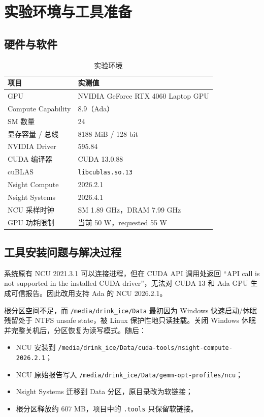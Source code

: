 \documentclass[UTF8,11pt,a4paper,fontset=fandol]{ctexart}
\newcommand{\code}[1]{\nolinkurl{#1}}
\begin{document}
\section{实验环境与工具准备}

\subsection{硬件与软件}

\begin{table}[H]
\centering
\caption{实验环境}
\begin{tabular}{ll}
\toprule
项目 & 实测值 \\
\midrule
GPU & NVIDIA GeForce RTX 4060 Laptop GPU \\
Compute Capability & 8.9（Ada） \\
SM 数量 & 24 \\
显存容量 / 总线 & 8188 MiB / 128 bit \\
NVIDIA Driver & 595.84 \\
CUDA 编译器 & CUDA 13.0.88 \\
cuBLAS & \code{libcublas.so.13} \\
Nsight Compute & 2026.2.1 \\
Nsight Systems & 2026.4.1 \\
NCU 采样时钟 & SM 1.89 GHz，DRAM 7.99 GHz \\
GPU 功耗限制 & 当前 50 W，requested 55 W \\
\bottomrule
\end{tabular}
\end{table}

\subsection{工具安装问题与解决过程}

系统原有 NCU 2021.3.1 可以连接进程，但在 CUDA API 调用处返回 ``API call is not supported in the installed CUDA driver''，无法对 CUDA 13 和 Ada GPU 生成可信报告。因此改用支持 Ada 的 NCU 2026.2.1\cite{ncu-download}。

根分区空间不足，而 \code{/media/drink_ice/Data} 最初因为 Windows 快速启动/休眠残留处于 NTFS unsafe state，被 Linux 保护性地只读挂载。关闭 Windows 休眠并完整关机后，分区恢复为读写模式。随后：

\begin{itemize}
  \item NCU 安装到 \code{/media/drink_ice/Data/cuda-tools/nsight-compute-2026.2.1}；
  \item NCU 原始报告写入 \code{/media/drink_ice/Data/gemm-opt-profiles/ncu}；
  \item Nsight Systems 迁移到 Data 分区，原目录改为软链接；
  \item 根分区释放约 607 MB，项目中的 \code{.tools} 只保留软链接。
\end{itemize}
\end{document}
